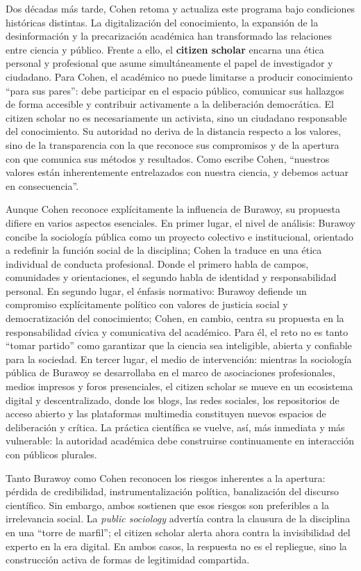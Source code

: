 \documentclass[
  spanish,
  letterpaper,
  DIV=11,
  numbers=noendperiod]{scrreprt}
\begin{document}
\begin{tcolorbox}
Dos décadas más tarde, Cohen retoma y actualiza este programa bajo
condiciones históricas distintas. La digitalización del conocimiento, la
expansión de la desinformación y la precarización académica han
transformado las relaciones entre ciencia y público. Frente a ello, el
\textbf{citizen scholar} encarna una ética personal y profesional que
asume simultáneamente el papel de investigador y ciudadano. Para Cohen,
el académico no puede limitarse a producir conocimiento ``para sus
pares'': debe participar en el espacio público, comunicar sus hallazgos
de forma accesible y contribuir activamente a la deliberación
democrática. El citizen scholar no es necesariamente un activista, sino
un ciudadano responsable del conocimiento. Su autoridad no deriva de la
distancia respecto a los valores, sino de la transparencia con la que
reconoce sus compromisos y de la apertura con que comunica sus métodos y
resultados. Como escribe Cohen, ``nuestros valores están inherentemente
entrelazados con nuestra ciencia, y debemos actuar en consecuencia''.

Aunque Cohen reconoce explícitamente la influencia de Burawoy, su
propuesta difiere en varios aspectos esenciales. En primer lugar, el
nivel de análisis: Burawoy concibe la sociología pública como un
proyecto colectivo e institucional, orientado a redefinir la función
social de la disciplina; Cohen la traduce en una ética individual de
conducta profesional. Donde el primero habla de campos, comunidades y
orientaciones, el segundo habla de identidad y responsabilidad personal.
En segundo lugar, el énfasis normativo: Burawoy defiende un compromiso
explícitamente político con valores de justicia social y democratización
del conocimiento; Cohen, en cambio, centra su propuesta en la
responsabilidad cívica y comunicativa del académico. Para él, el reto no
es tanto ``tomar partido'' como garantizar que la ciencia sea
inteligible, abierta y confiable para la sociedad. En tercer lugar, el
medio de intervención: mientras la sociología pública de Burawoy se
desarrollaba en el marco de asociaciones profesionales, medios impresos
y foros presenciales, el citizen scholar se mueve en un ecosistema
digital y descentralizado, donde los blogs, las redes sociales, los
repositorios de acceso abierto y las plataformas multimedia constituyen
nuevos espacios de deliberación y crítica. La práctica científica se
vuelve, así, más inmediata y más vulnerable: la autoridad académica debe
construirse continuamente en interacción con públicos plurales.

Tanto Burawoy como Cohen reconocen los riesgos inherentes a la apertura:
pérdida de credibilidad, instrumentalización política, banalización del
discurso científico. Sin embargo, ambos sostienen que esos riesgos son
preferibles a la irrelevancia social. La \emph{public sociology}
advertía contra la clausura de la disciplina en una ``torre de marfil'';
el citizen scholar alerta ahora contra la invisibilidad del experto en
la era digital. En ambos casos, la respuesta no es el repliegue, sino la
construcción activa de formas de legitimidad compartida.


\end{tcolorbox}
\end{document}
